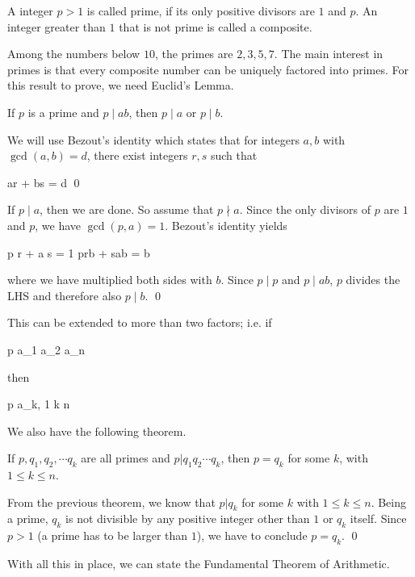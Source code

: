 
\begin{definition}
    A integer $p>1$ is called prime, if its only positive divisors are $1$ and $p$. An integer greater than $1$ that is not prime is called a composite.
\end{definition}

Among the numbers below $10$, the primes are $2, 3, 5, 7$. The main interest in primes is that every composite number can be uniquely factored into primes.  For this result to prove, we need Euclid's Lemma.

\begin{theorem}
    If $p$ is a prime and $p \mid ab$, then $p \mid a$ or $p \mid b$.
\end{theorem}

We will use Bezout's identity which states that for integers $a, b$ with $\gcd(a,b) = d$, there exist integers $r,s$ such that

\bee
ar + bs = d \qed
\eee

If $p \mid a$, then we are done. So assume that $p \nmid a$. Since the only divisors of $p$ are $1$ and $p$, we have $\gcd(p,a) = 1$. Bezout's identity yields

\bee
p r + a s = 1 \rightarrow prb + sab = b
\eee

where we have multiplied both sides with $b$. Since $p \mid p$ and $p \mid ab$, $p$ divides the LHS and therefore also $p \mid b$. \qed

This can be extended to more than two factors; i.e. if

\bee
p \mid a_1 a_2 \cdots a_n
\eee

then

\bee
p \mid a_k,  1 \leq k \leq n
\eee

We also have the following theorem.

\begin{theorem}\label{th:primes_01_01}
    If $p, q_1, q_2, \cdots q_k$ are all primes and $p | q_1 q_2 \cdots q_k$, then $p = q_k$ for some $k$, with $1 \leq k \leq n$.
\end{theorem}

From the previous theorem, we know that $p | q_k$ for some $k$ with $1 \leq k \leq n$. Being a prime, $q_k$ is not divisible by any positive integer other than $1$ or $q_k$ itself. Since $p>1$ (a prime has to be larger than $1$), we have to conclude $p = q_k$. \qed

With all this in place, we can state the Fundamental Theorem of Arithmetic.

